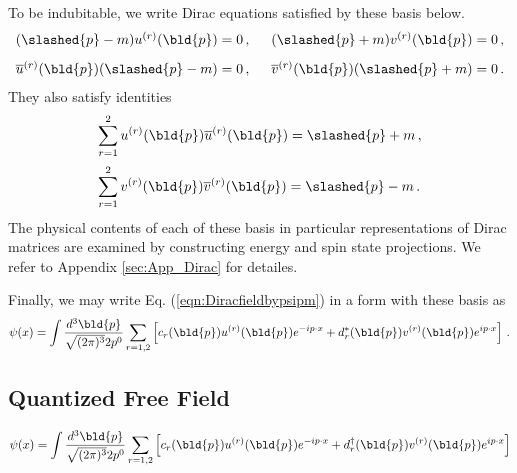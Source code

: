 To be indubitable, we write Dirac equations satisfied by these basis below.
\begin{eqnarray}
\begin{array}{l}
(\slashed{p} - m) u^{(r)}(\bld{p}) = 0\,,
\hspace{5mm}
(\slashed{p} + m) v^{(r)}(\bld{p}) = 0\,,
\vspace{3mm}
\\
\overline{u}^{(r)}(\bld{p}) (\slashed{p} - m) = 0\,,
\hspace{5mm}
\overline{v}^{(r)}(\bld{p}) (\slashed{p} + m) = 0\,.
\end{array}
\label{eqn:DiracEqDiracspinors}
\end{eqnarray}
They also satisfy identities
\begin{eqnarray}
\begin{array}{l}
\displaystyle
\sum_{r=1}^2 u^{(r)}(\bld{p}) 
\overline{u}^{(r)}(\bld{p})
=
\slashed{p} + m\,,
\vspace{2mm}
\\
\displaystyle
\sum_{r=1}^2 v^{(r)}(\bld{p}) 
\overline{v}^{(r)}(\bld{p})
=
\slashed{p} - m\,.
\end{array}
\label{eqn:DiracspinorPolSum}
\end{eqnarray}
The physical contents of each of these basis 
in particular representations of Dirac matrices
are examined by
constructing energy and spin state projections.
We refer to Appendix \ref{sec:App_Dirac} for detailes.

Finally, we may write Eq. (\ref{eqn:Diracfieldbypsipm})  in a form with these basis as
\begin{eqnarray}
\psi(x) = \int \frac{d^3 \bld{p}}{\sqrt{(2\pi)^3} 2 p^0}
\sum_{r = 1, 2} \left[
c_r(\bld{p}) u^{(r)}(\bld{p}) e^{-ip\cdot x} + d_r^*(\bld{p}) v^{(r)}(\bld{p}) e^{ip\cdot x}
\right] \,.
\end{eqnarray}

\subsection{Quantized Free Field}
\begin{equation}
\psi(x) 
=
\int \frac{d^3 \bld{p}}{\sqrt{(2\pi)^3} 2 p^0}
\sum_{r = 1,2}
\left[
c_r(\bld{p}) u^{(r)}(\bld{p}) e^{-ip \cdot x}
+
d_r^\dagger(\bld{p}) v^{(r)}(\bld{p}) e^{ip \cdot x}
\right]
\end{equation}

